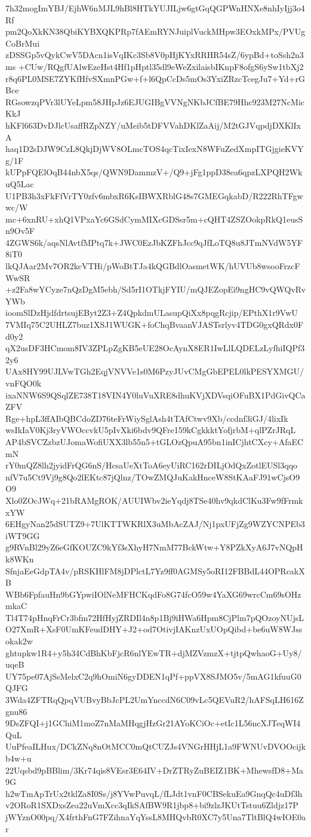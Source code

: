 7h32mogImYBJ/EjhW6nMJL9hBl8HTkYUJILjw6gtGqQGPWnHNXe8nhIyIjj3o4Rf
pm2QoXkKN38QbiKYBXQKPRp7fAEmRYNJuiplVuckMHpw3EOxkMPx/PVUgCoBrMui
zDSSGp5vQykCwV5DAcn1isVqIKc3Sb8V0pHjKYxRRHR54sZ/6ypBd+toSsh2n3ms
+CUw/RQgfUAlwEzeHst4Hf1pHptl35dl9eWeZxilaisbIKnpF8ofgS6ySw1tbXj2
r8q6PL0MSE7ZYKfHfvSXmnPGw+f+l6QpCcDs5mOs3YxiZRzcTcegJu7+Yd+rGBce
RGsowzqPVr3lUYeLpm58JHpJz6EJUGIBgVVNgNKbJCfBE79Hhc923M27NcMicKkJ
hKFl663DvDJlcUsaffRZpNZY/uMeib5tDFVVahDKlZaAij/M2tGJVqpdjDXKlIxA
haq1D2sDJW9CzL8QkjDjWV8OLmcTOS4qcTixIexN8WFuZedXmpITGjgieKVYg/1F
kUPpFQElOqB44nbX5qs/QWN9DammzV+/Q9+jFg1ppD38ea6qpzLXPQH2WkuQ5Lac
U1PB3h3xFkFfVrTY0zfv6mbxR6KsIBWXRblG48s7GMEGqkabD/R222RhTFgwwc/W
mc+6xnRU+xhQ1VPxaYc6GSdCymMIXcGDSsr5m+cQHT4ZSZOokpRkQ1eusSn9Ov5F
4ZGWS6k/aqsNlAvtfMPtq7k+JWC0EzJbKZFhJcc9qJfLoTQ8u8JTmNVdW5YF8iT0
lkQJAar2Mv7OR2kcVTHi/pWoBtTJa4kQGBdlOasmetWK/hUVUb8wsooFrzcFWwSR
+z2Fa8wYCyze7nQzDgM5ebh/Sd5rI1OTkjFYIU/mQJEZopEi9ngHC9vQWQvRvYWb
ioomSlDzHjdfdrtsujEByt2Z3+Z4QpkdmULasupQiXx8pqgRcjip/EPthX1r9VwU
7VMIq75C2UHLZ7buz1XSJ1WUGK+foChqBvaanVJASTsrlyv4TDG0gxQRdx0Fd0y2
qX2usDF3HCmom8IV3ZPLpZgKB5eUE28OcAynX8ER1IwLlLQDELzLyfhiIQPf32y6
UAx8HY99UJLVwTGh2EqjVNVVe1s0M6PzyJUvCMgGbEPEL0lkPESYXMGU/vnFQO0k
ixaNNW6S9QSqlZE738T18VIN4Y0luVuXRE8dhuKVjXDVsqiOFuBX1PdGivQCaZFV
Rge+hpL3ffAIbQBCdoZD76teFrWiySglAsh4tTAfCtwv9Xb/ccdnf3iGJ/4lixIk
wsIkIaV0Kj3ryVWOccvkU5pIvXki6bdv9QFre159kCgkkktYofjrbM+qlPZrJRqL
AP4bSVCZzbzUJomaWofiUXX3lb55n5+tGLOzQpuA95bn1inICjhtCXcy+AfaECmN
rY0mQZ8lh2jyidFrQG6nS/HcsaUeXtToA6eyUiRC162rDILjOdQxZotlEUSl3qqo
nfV7u5Ct9Vj9g8Qo2lEKtc87jQlnz/TOwZMQJuKakHnceW8StKAaFJ91wCjsO9O9
Xlo0ZOcJWq+21bRAMgROK/AUUIWbv2ieYqdj8TSe40hv9qkdClKu3Fw9fFrmkxYW
6EHgyNan25dSUTZ9+7UlKTTWKRlX3uMbAcZAJ/Nj1pxUFjZg9WZYCNPEb3iWT9GG
g9RVnBl29yZ6eGfKOUZC9kYf3sXhyH7NmM77BckWtw+Y8PZkXyA6J7vNQpHk8WKn
SfnjaEeGdpTA4v/pRSKHlFM8jDPlctL7Yz9ff0AGMSy5oRI12FBBdL44OPRcakXB
WBb6FpfauHn9bGYpwiIOlNeMFHCKqdFo8G74fcO59w4YaXG69wrcCm69sOHzmkaC
Tl4T74pHnqFrCr3bfm72HfHyjZRDIl4n8p1Bj9iHWa6Hpm8CjPlm7pQOzoyNUjsL
O27XmR+XsF0UmKFeudDHY+J2+od7OtivjIAKnzUxUOpQibd+be6uW8WJssokak2w
ghtupkw1R4+y5h34CdBhKbFjcR6nlYEwTR+djMZVzmzX+tjtpQwhaoG+Uy8/uqeB
UY75pe07AjSsMelxC2q9hOmiN6gyDDEN1qPf+ppVX8SJMO5v/5mAG1kfuuG0QJFG
3Wda4ZFTRqQpqVUBvyBbJcPL2UmYnccdN6C09vLc5QEVuR2/hAFSqLH616Zgnu86
9DsZFQI+j1GChiM1moZ7nMaMHqgjHzGr21AYoKCiOc+etIc1L56ncXJTeqWI4QuL
UuPfeaILHux/DCkZNq8nOtMCC0mQtCUZJs4VNGrHHjL1a9FWNUvDVOOcijkb4w+u
22Uqsbd9pBBlim/3Kr74qis8VEsr3E64IV+DrZTRyZuBEIZ1BK+MhewsfD8+Ma9G
h2wTmApTrUx2tklZa8I0Ss/j8YVwPuvqL/fLJdt1vnF0CBSekuEa9GnqQc4uDf3h
v2ORoR1SXDxsZea22uVmXcc3qIkSAfBW9R1jbp8+bi9zlzJKUtTstuu6Zldjz17P
jWYznO00pq/X4frthFnG7FZihnaYqYssL8MHQvbR0XC7y5Una7TltBlQ4wIOE0ar
